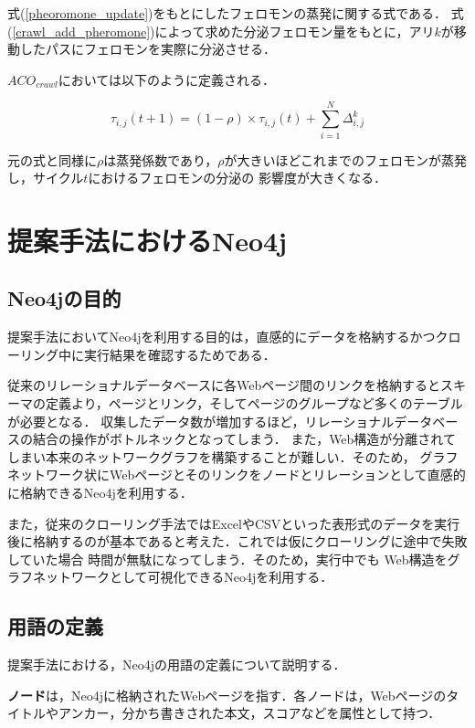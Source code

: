 式(\ref{pheoromone_update})をもとにしたフェロモンの蒸発に関する式である．
式(\ref{crawl_add_pheromone})によって求めた分泌フェロモン量をもとに，アリ\(k\)が移動したパスにフェロモンを実際に分泌させる．

\(ACO_{crawl}\)においては以下のように定義される．

\begin{equation}
    \label{crawl_pheoromone_update}
    {\tau}_{i, j}(t+ 1) = {(1-\rho)}{\times}{\tau}_{i, j}(t) + {\sum}_{i=1}^N {\Delta}_{i, j}^k
\end{equation}

元の式と同様に\(\rho\)は蒸発係数であり，\(\rho\)が大きいほどこれまでのフェロモンが蒸発し，サイクル\(t\)におけるフェロモンの分泌の
影響度が大きくなる．


\section{提案手法におけるNeo4j}

\subsection{Neo4jの目的}

提案手法においてNeo4jを利用する目的は，直感的にデータを格納するかつクローリング中に実行結果を確認するためである．

従来のリレーショナルデータベースに各Webページ間のリンクを格納するとスキーマの定義より，ページとリンク，そしてページのグループなど多くのテーブルが必要となる．
収集したデータ数が増加するほど，リレーショナルデータベースの結合の操作がボトルネックとなってしまう．
また，Web構造が分離されてしまい本来のネットワークグラフを構築することが難しい．そのため，
グラフネットワーク状にWebページとそのリンクをノードとリレーションとして直感的に格納できるNeo4jを利用する．

また，従来のクローリング手法ではExcelやCSVといった表形式のデータを実行後に格納するのが基本であると考えた．これでは仮にクローリングに途中で失敗していた場合
時間が無駄になってしまう．そのため，実行中でも
Web構造をグラフネットワークとして可視化できるNeo4jを利用する．

\subsection{用語の定義}

提案手法における，Neo4jの用語の定義について説明する．

{\bf ノード}は，Neo4jに格納されたWebページを指す．各ノードは，Webページのタイトルやアンカー，分かち書きされた本文，スコアなどを属性として持つ．

